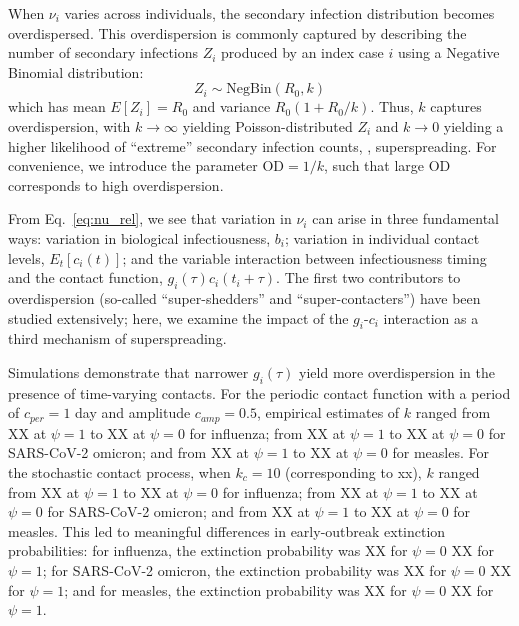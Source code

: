 When $\nu_i$ varies across individuals, the secondary infection distribution becomes overdispersed. This overdispersion is commonly captured by describing the number of secondary infections $Z_i$ produced by an index case $i$ using a Negative Binomial distribution: 
\begin{equation}
	Z_i \sim \text{NegBin}(R_0, k)
\end{equation}
which has mean $E[Z_i] = R_0$ and variance $R_0 (1 + R_0 / k)$. Thus, $k$ captures overdispersion, with $k \rightarrow \infty$ yielding Poisson-distributed $Z_i$ and $k \rightarrow 0$ yielding a higher likelihood of ``extreme'' secondary infection counts, \ie, superspreading. For convenience, we introduce the parameter $\text{OD} = 1/k$, such that large OD corresponds to high overdispersion. 

From Eq.~\ref{eq:nu_rel}, we see that variation in $\nu_i$ can arise in three fundamental ways: variation in biological infectiousness, $b_i$; variation in individual contact levels, $E_t[c_i(t)]$; and the variable interaction between infectiousness timing and the contact function, $g_i(\tau) c_i(t_i + \tau)$. The first two contributors to overdispersion (so-called ``super-shedders'' and ``super-contacters'') have been studied extensively; here, we examine the impact of the $g_i$-$c_i$ interaction as a third mechanism of superspreading. 

Simulations demonstrate that narrower $g_i(\tau)$ yield more overdispersion in the presence of time-varying contacts. For the periodic contact function with a period of $c_{per} = 1$ day and amplitude $c_{amp} = 0.5$, empirical estimates of $k$ ranged from XX at $\psi = 1$ to XX at $\psi = 0$ for influenza; from XX at $\psi = 1$ to XX at $\psi = 0$ for SARS-CoV-2 omicron; and from XX at $\psi = 1$ to XX at $\psi = 0$ for measles. For the stochastic contact process, when $k_c = 10$ (corresponding to xx), $k$ ranged from XX at $\psi = 1$ to XX at $\psi = 0$ for influenza; from XX at $\psi = 1$ to XX at $\psi = 0$ for SARS-CoV-2 omicron; and from XX at $\psi = 1$ to XX at $\psi = 0$ for measles. This led to meaningful differences in early-outbreak extinction probabilities: for influenza, the extinction probability was XX for $\psi = 0$ \vs XX for $\psi = 1$; for SARS-CoV-2 omicron, the extinction probability was XX for $\psi = 0$ \vs XX for $\psi = 1$; and for measles, the extinction probability was XX for $\psi = 0$ \vs XX for $\psi = 1$. 

